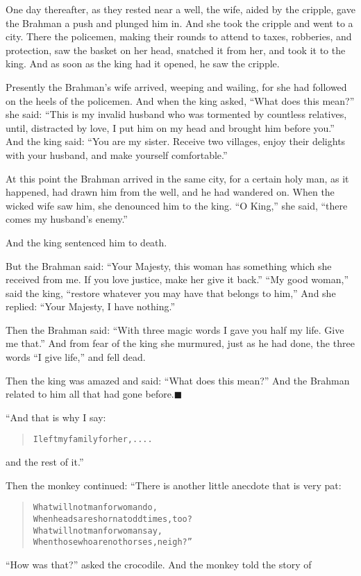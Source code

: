 \documentclass[article, twoside, 14pt]{memoir}
\newcommand{\qed}{\hfill \ensuremath{\blacksquare}}
\renewenvironment{verbatim}{%
\begin{quote}%
\vskip -10pt%
\begin{alltt}\normalfont\large}{\end{alltt}%
\end{quote}%
\vskip -10pt
} %
\begin{document}
One day thereafter, as they rested near a well, the wife, aided by
the cripple, gave the Brahman a push and plunged him in. And she
took the cripple and went to a city. There the policemen, making
their rounds to attend to taxes, robberies, and protection, saw the
basket on her head, snatched it from her, and took it to the king.
And as soon as the king had it opened, he saw the cripple.

Presently the Brahman's wife arrived, weeping and wailing, for she
had followed on the heels of the policemen. And when the king
asked, ``What does this mean?'' she said:
``This is my invalid husband who was tormented by countless relatives, until, distracted by love, I put him on my head and brought him before you.''
And the king said:
``You are my sister. Receive two villages, enjoy their delights with your husband, and make yourself comfortable.''

At this point the Brahman arrived in the same city, for a certain
holy man, as it happened, had drawn him from the well, and he had
wandered on. When the wicked wife saw him, she denounced him to the
king. ``O King,'' she said,
``there comes my husband's enemy.''

And the king sentenced him to death.

But the Brahman said:
``Your Majesty, this woman has something which she received from me. If you love justice, make her give it back.''
``My good woman,'' said the king,
``restore whatever you may have that belongs to him,'' And she
replied: ``Your Majesty, I have nothing.''

Then the Brahman said:
``With three magic words I gave you half my life. Give me that.''
And from fear of the king she murmured, just as he had done, the
three words ``I give life,'' and fell dead.

Then the king was amazed and said: ``What does this mean?'' And the
Brahman related to him all that had gone
before.\hyperref[s71]{\qed}

“And that is why I say:

\begin{verbatim}
I left my family for her, ....
\end{verbatim}
and the rest of it.”

Then the monkey continued: “There is another little anecdote that
is very pat:

\begin{verbatim}
What will not man for woman do,
When heads are shorn{\textemdash}at odd times, too?
What will not man for woman say,
When those who are not horses, neigh?”
\end{verbatim}
``How was that?'' asked the crocodile. And the monkey told the
story of
\end{document}
